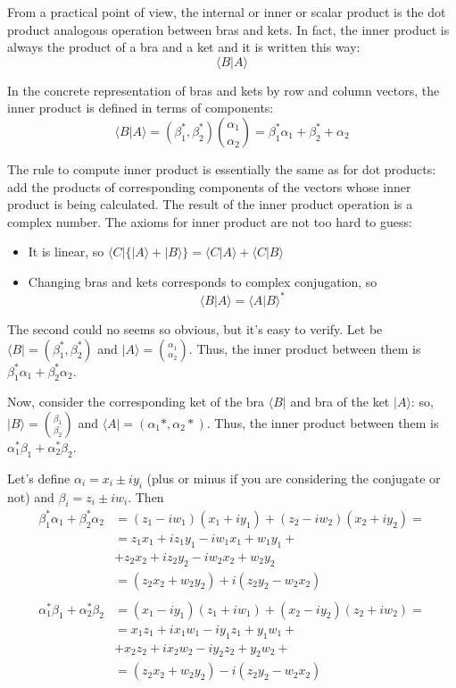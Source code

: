\documentclass[a4paper,10pt]{article}
\begin{document}
From a practical point of view, the internal or inner or scalar product is the dot product analogous operation between bras and kets. In fact, the inner product is always the product of a bra and a ket and it is written this way:
$$\langle B|A\rangle$$

In the concrete representation of bras and kets by row and column vectors, the inner product is defined in terms of components:
$$\langle B|A\rangle = (\beta_1^*, \beta_2^*)\binom{\alpha_1}{\alpha_2} = \beta_1^*\alpha_1 + \beta_2^*+\alpha_2$$

The rule to compute inner product is essentially the same as for dot products: add the products of corresponding components of the vectors whose inner product is being calculated. The result of the inner product operation is a complex number. The axioms for inner product are not too hard to guess:
\begin{itemize}
    \item It is linear, so $\langle C| \{|A\rangle + |B\rangle\} = \langle C|A\rangle + \langle C|B\rangle$
    \item Changing bras and kets corresponds to complex conjugation, so
    $$\langle B|A\rangle = \langle A|B\rangle^*$$
\end{itemize}

The second could no seems so obvious, but it's easy to verify. Let be $\langle B| = (\beta_1^*, \beta_2^*)$ and $|A\rangle = \binom{\alpha_1}{\alpha_2}$. Thus, the inner product between them is $\beta_1^*\alpha_1 + \beta_2^*\alpha_2$. 

Now, consider the corresponding ket of the bra $\langle B|$ and bra of the ket $|A\rangle$: so, $|B\rangle = \binom{\beta_1}{ \beta_2}$ and $\langle A| = (\alpha_1*, \alpha_2*)$. Thus, the inner product between them is $\alpha_1^*\beta_1 + \alpha_2^*\beta_2$.

Let's define $\alpha_i = x_i \pm iy_i$ (plus or minus if you are considering the conjugate or not) and $\beta_i = z_i \pm iw_i$. Then
\begin{equation*}
\begin{split}
\beta_1^*\alpha_1 + \beta_2^*\alpha_2 & = (z_1 - iw_1)(x_1 + iy_1) + (z_2 - iw_2)(x_2 + iy_2) = \\
 & = z_1x_1 + iz_1y_1 -iw_1x_1 + w_1y_1 + \\
 & + z_2x_2 + iz_2y_2 -iw_2x_2 + w_2y_2 \\
 & = (z_2x_2 + w_2y_2) + i(z_2y_2 - w_2x_2) \\
 & \ \\
\alpha_1^*\beta_1 + \alpha_2^*\beta_2 & = (x_1 - iy_1)(z_1 + iw_1) + (x_2 - iy_2)(z_2 + iw_2) = \\
 & = x_1z_1 + ix_1w_1 -iy_1z_1 + y_1w_1 + \\
 & + x_2z_2 + ix_2w_2 -iy_2z_2 + y_2w_2 + \\
 & = (z_2x_2 + w_2y_2) - i(z_2y_2 - w_2x_2) \\
\end{split}
\end{equation*}
\end{document}
